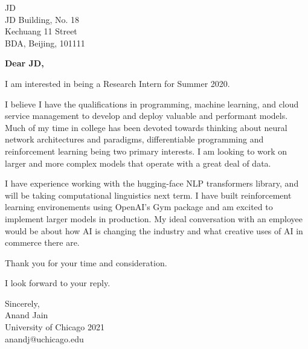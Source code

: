 \documentclass[11pt,a4paper]{letter} %
\begin{document}
\begin{letter}{JD \\ JD Building, No. 18 \\ Kechuang 11 Street \\ BDA, Beijing, 101111} 

\opening{\textbf{Dear JD,}}

I am interested in being a Research Intern for Summer 2020.

I believe I have the qualifications in programming, machine learning, and cloud service management to develop and deploy valuable and performant models.
Much of my time in college has been devoted towards thinking about neural network architectures and paradigms, differentiable programming and reinforcement learning being two primary interests. 
I am looking to work on larger and more complex models that operate with a great deal of data.

I have experience working with the hugging-face NLP transformers library, and will be taking computational linguistics next term.
I have built reinforcement learning environements using OpenAI's Gym package and am excited to implement larger models in production.
My ideal conversation with an employee would be about how AI is changing the industry and what creative uses of AI in commerce there are.

Thank you for your time and consideration.

I look forward to your reply.

\closing{Sincerely, \\ Anand Jain \\ University of Chicago 2021 \\ anandj@uchicago.edu}

\end{letter}
 
\end{document}
